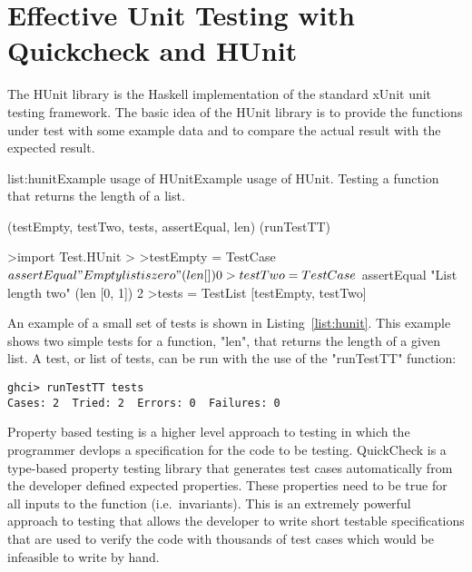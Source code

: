 \section{Effective Unit Testing with Quickcheck and HUnit}
\label{section:testing}



The HUnit library is the Haskell implementation of the standard xUnit unit testing framework. The
basic idea of the HUnit library is to provide the functions under test with some example data
and to compare the actual result with the expected result.

\vspace{-0.5em}
\begin{listing}{list:hunit}{Example usage of HUnit}{Example usage of HUnit. Testing a function that returns the length of a list.}{}
\end{listing}\vspace{-1.5em}

\functions(testEmpty, testTwo, tests, assertEqual, len)
\functions(runTestTT)
\begin{haskell}
>import Test.HUnit
>
>testEmpty = TestCase $ assertEqual "Empty list is zero" (len []) 0
>testTwo = TestCase $ assertEqual "List length two" (len [0, 1]) 2
>tests = TestList [testEmpty, testTwo]

\end{haskell}
\noindent An example of a small set of tests is shown in Listing~\ref{list:hunit}. This example shows
two simple tests for a function, "len", that returns the length of a given list.
A test, or list of tests, can be run with the use of the "runTestTT" function:

\begin{verbatim}
ghci> runTestTT tests
Cases: 2  Tried: 2  Errors: 0  Failures: 0
\end{verbatim}


Property based testing is a higher level approach to testing in which the programmer devlops a specification
for the code to be testing. QuickCheck is a type-based property testing library that generates test
cases automatically from the developer defined expected properties.\cite{claessen2000} These properties
need to be true for all inputs to the function (i.e.\ invariants). This is an extremely
powerful approach to testing that allows the developer to write short testable specifications that
are used to verify the code with thousands of test cases which would be infeasible to write by hand.

